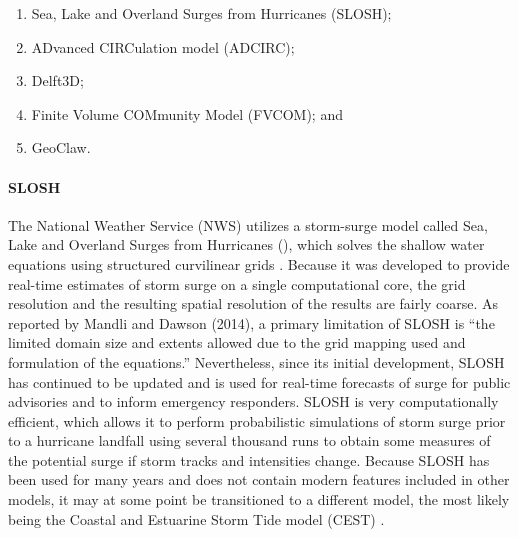 \begin{enumerate}
    \item Sea, Lake and Overland Surges from Hurricanes  (SLOSH);
    \item ADvanced CIRCulation model (ADCIRC);
    \item Delft3D;
    \item Finite Volume COMmunity Model (FVCOM); and
    \item GeoClaw.
\end{enumerate}

\paragraph{SLOSH} The National Weather Service (NWS) utilizes a storm-surge model called Sea, Lake and Overland Surges from Hurricanes (), which solves the shallow water equations using structured curvilinear grids \citep{jelesnianski1992NWS48}. Because it was developed to provide real-time estimates of storm surge on a single computational core, the grid resolution and the resulting spatial resolution of the results are fairly coarse. As reported by Mandli and Dawson (2014), a primary limitation of SLOSH is ``the limited domain size and extents allowed due to the grid mapping used and formulation of the equations.'' Nevertheless, since its initial development, SLOSH has continued to be updated and is used for real-time forecasts of surge for public advisories and to inform emergency responders. SLOSH is very computationally efficient, which allows it to perform probabilistic simulations of storm surge prior to a hurricane landfall using several thousand runs to obtain some measures of the potential surge if storm tracks and intensities change. Because SLOSH has been used for many years and does not contain modern features included in other models, it may at some point be transitioned to a different model, the most likely being the Coastal and Estuarine Storm Tide model (CEST) \citep{zhang2017transition}. 

